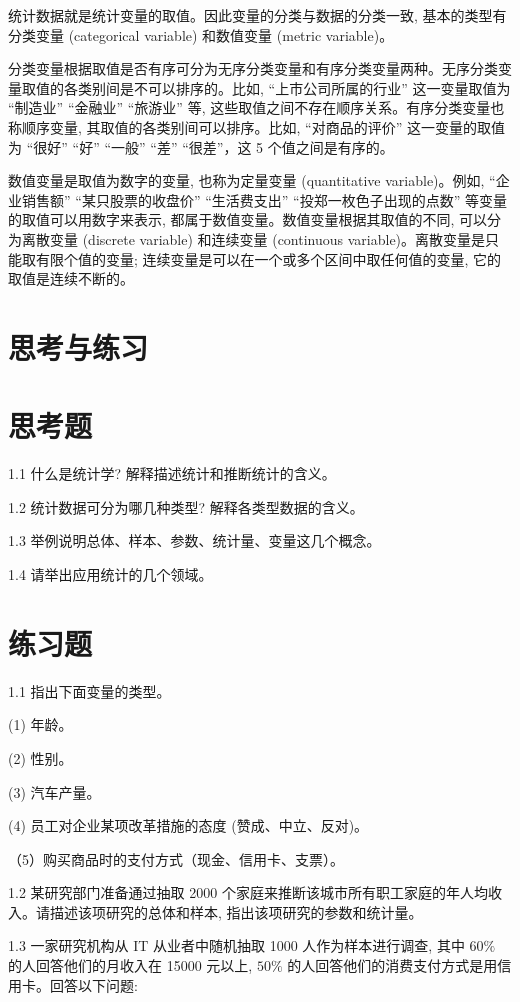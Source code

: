 \documentclass[10pt]{article}
\begin{document}
\begin{CJK*}{UTF8}{bsmi}
统计数据就是统计变量的取值。因此变量的分类与数据的分类一致, 基本的类型有分类变量 (categorical variable) 和数值变量 (metric variable)。

分类变量根据取值是否有序可分为无序分类变量和有序分类变量两种。无序分类变量取值的各类别间是不可以排序的。比如, “上市公司所属的行业” 这一变量取值为 “制造业” “金融业” “旅游业” 等, 这些取值之间不存在顺序关系。有序分类变量也称顺序变量, 其取值的各类别间可以排序。比如, “对商品的评价” 这一变量的取值为 “很好” “好” “一般” “差” “很差”，这 5 个值之间是有序的。

数值变量是取值为数字的变量, 也称为定量变量 (quantitative variable)。例如, “企业销售额” “某只股票的收盘价” “生活费支出” “投郑一枚色子出现的点数” 等变量的取值可以用数字来表示, 都属于数值变量。数值变量根据其取值的不同, 可以分为离散变量 (discrete variable) 和连续变量 (continuous variable)。离散变量是只能取有限个值的变量; 连续变量是可以在一个或多个区间中取任何值的变量, 它的取值是连续不断的。

\section*{思考与练习}
\section*{思考题}
1.1 什么是统计学? 解释描述统计和推断统计的含义。

1.2 统计数据可分为哪几种类型? 解释各类型数据的含义。

1.3 举例说明总体、样本、参数、统计量、变量这几个概念。

1.4 请举出应用统计的几个领域。

\section*{练习题}
1.1 指出下面变量的类型。

(1) 年龄。

(2) 性别。

(3) 汽车产量。

(4) 员工对企业某项改革措施的态度 (赞成、中立、反对)。

（5）购买商品时的支付方式（现金、信用卡、支票）。

1.2 某研究部门准备通过抽取 2000 个家庭来推断该城市所有职工家庭的年人均收入。请描述该项研究的总体和样本, 指出该项研究的参数和统计量。

1.3 一家研究机构从 IT 从业者中随机抽取 1000 人作为样本进行调查, 其中 $60 \%$ 的人回答他们的月收入在 15000 元以上, $50 \%$ 的人回答他们的消费支付方式是用信用卡。回答以下问题:


\end{CJK*}
\end{document}
